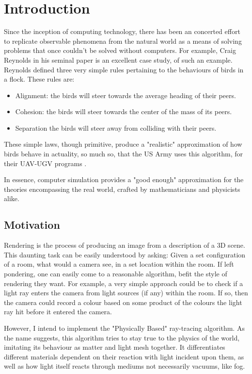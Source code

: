 \documentclass[../main.tex]{subfiles}
\begin{document}
\section{Introduction}
Since the inception of computing technology, there has been an concerted effort to replicate observable phenomena from the natural world as a means of solving problems that once couldn't be solved without computers.
\newline
For example, Craig Reynolds in his seminal paper \cite{reynolds_flocks_1987} is an excellent case study, of such an example. Reynolds defined three very simple rules pertaining to the behaviours of birds in a flock. These rules are: 
\begin{itemize}
  \item Alignment: the birds will steer towards the average heading of their peers.
  \item Cohesion: the birds will steer towards the center of the mass of its peers.  
  \item Separation the birds will steer away from colliding with their peers.
\end{itemize}
These simple laws, though primitive, produce a "realistic" approximation of how birds behave in actuality, so much so, that the US Army uses this algorithm, for their UAV-UGV programs \cite{saska_coordination_2014}.

In essence, computer simulation provides a "good enough" approximation for the theories encompassing the real world, crafted by mathematicians and physicists alike.
\subsection{Motivation}
Rendering is the process of producing an image from a description of a 3D scene. This daunting task can be easily understood by asking: Given a set configuration of a room, what would a camera see, in a set location within the room. 
If left pondering, one can easily come to a reasonable algorithm, befit the style of rendering they want. For example, a very simple approach could be to check if a light ray enters the camera from light sources (if any) within the room. If so, then the camera could record a colour based on some product of the colours the light ray hit before it entered the camera. 

However, I intend to implement the "Physically Based" ray-tracing algorithm.
As the name suggests, this algorithm tries to stay true to the physics of the world, imitating its behaviour as matter and light mesh together. It differentiates different materials dependent on their reaction with light incident upon them, as well as how light itself reacts through mediums not necessarily vacuums, like fog. 
\end{document}

